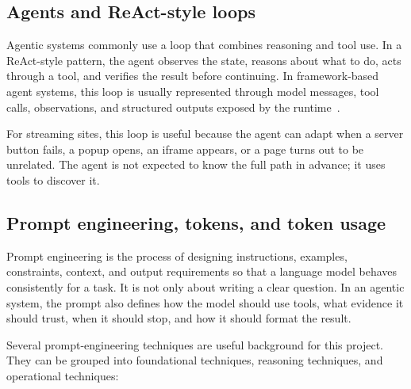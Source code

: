 \subsection{Agents and ReAct-style loops}

Agentic systems commonly use a loop that combines reasoning and tool use. In a
ReAct-style pattern, the agent observes the state, reasons about what to do, acts through
a tool, and verifies the result before continuing. In framework-based agent systems,
this loop is usually represented through model messages, tool calls, observations, and
structured outputs exposed by the runtime~\cite{langchain-docs}.



For streaming sites, this loop is useful because the agent can adapt when a server
button fails, a popup opens, an iframe appears, or a page turns out to be unrelated. The
agent is not expected to know the full path in advance; it uses tools to discover it.

\subsection{Prompt engineering, tokens, and token usage}

Prompt engineering is the process of designing instructions, examples, constraints,
context, and output requirements so that a language model behaves consistently for a
task. It is not only about writing a clear question. In an agentic system, the prompt
also defines how the model should use tools, what evidence it should trust, when it
should stop, and how it should format the result.

Several prompt-engineering techniques are useful background for this project. They can
be grouped into foundational techniques, reasoning techniques, and operational
techniques:

